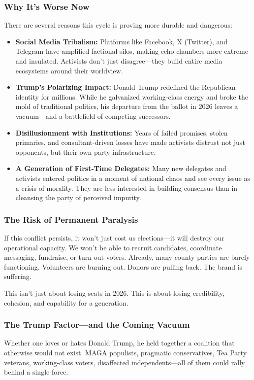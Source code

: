 \subsubsection{Why It’s Worse Now}
There are several reasons this cycle is proving more durable and dangerous:
\begin{itemize}
\item \textbf{Social Media Tribalism:} Platforms like Facebook, X (Twitter), and Telegram have amplified factional silos, making echo chambers more extreme and insulated. Activists don’t just disagree—they build entire media ecosystems around their worldview.
\item \textbf{Trump’s Polarizing Impact:} Donald Trump redefined the Republican identity for millions. While he galvanized working-class energy and broke the mold of traditional politics, his departure from the ballot in 2026 leaves a vacuum—and a battlefield of competing successors.
\item \textbf{Disillusionment with Institutions:} Years of failed promises, stolen primaries, and consultant-driven losses have made activists distrust not just opponents, but their own party infrastructure.
\item \textbf{A Generation of First-Time Delegates:} Many new delegates and activists entered politics in a moment of national chaos and see every issue as a crisis of morality. They are less interested in building consensus than in cleansing the party of perceived impurity.
\end{itemize}

\subsubsection{The Risk of Permanent Paralysis}
If this conflict persists, it won’t just cost us elections—it will destroy our operational capacity. We won’t be able to recruit candidates, coordinate messaging, fundraise, or turn out voters. Already, many county parties are barely functioning. Volunteers are burning out. Donors are pulling back. The brand is suffering.

This isn’t just about losing seats in 2026. This is about losing credibility, cohesion, and capability for a generation.

\subsubsection{The Trump Factor—and the Coming Vacuum}
Whether one loves or hates Donald Trump, he held together a coalition that otherwise would not exist. MAGA populists, pragmatic conservatives, Tea Party veterans, working-class voters, disaffected independents—all of them could rally behind a single force.

